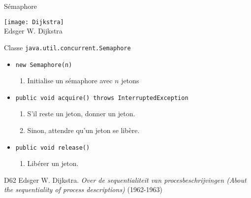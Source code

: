 
\begingroup

\begin{frame}{Sémaphore}
  \begin{center}
    \texttt{[image: Dijkstra]}\\
    Edsger W. Dijkstra
  \end{center}
  \vFill
  \begin{block}{Classe \lstinline{java.util.concurrent.Semaphore}}
      \begin{itemize}
      \item \lstinline{new Semaphore(n)}
	\begin{enumerate}
	\item Initialise un sémaphore avec $n$ jetons
	\end{enumerate}
      \item \lstinline{public void acquire() throws InterruptedException}
	\begin{enumerate}
	\item S'il reste un jeton, donner un jeton.
	\item Sinon, attendre qu'un jeton se libère.
	\end{enumerate}
      \item \lstinline{public void release()}
	\begin{enumerate}
	\item Libérer un jeton.
	\end{enumerate}
      \end{itemize}
  \end{block}
  \vFill
  \begin{citing}
  \item[D62] Edsger W. Dijkstra. \textit{Over de sequentialiteit van procesbeschrijvingen (About the sequentiality of process descriptions)} (1962-1963)
  \end{citing}
\end{frame}

\endgroup
\endinput
